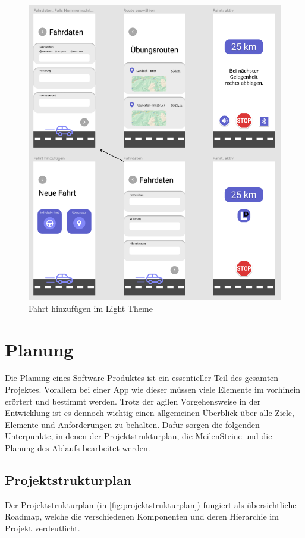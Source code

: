 \begin{figure}[H]
	\centering
	\includegraphics[width=15cm]{figures/mockup3.png}
	\caption{Fahrt hinzufügen im Light Theme}
	\label{fig:mockup3}
\end{figure}

\section{Planung}
Die Planung eines Software-Produktes ist ein essentieller Teil des gesamten Projektes. Vorallem bei einer App wie dieser müssen viele Elemente im vorhinein erörtert und bestimmt werden. Trotz der agilen Vorgehensweise in der Entwicklung ist es dennoch wichtig einen allgemeinen Überblick über alle Ziele, Elemente und Anforderungen zu behalten. Dafür sorgen die folgenden Unterpunkte, in denen der Projektstrukturplan, die MeilenSteine und die Planung des Ablaufs bearbeitet werden.

\newpage
\subsection{Projektstrukturplan}
Der Projektstrukturplan (in \ref{fig:projektstrukturplan}) fungiert als übersichtliche Roadmap, welche die verschiedenen Komponenten und deren Hierarchie im Projekt verdeutlicht.

